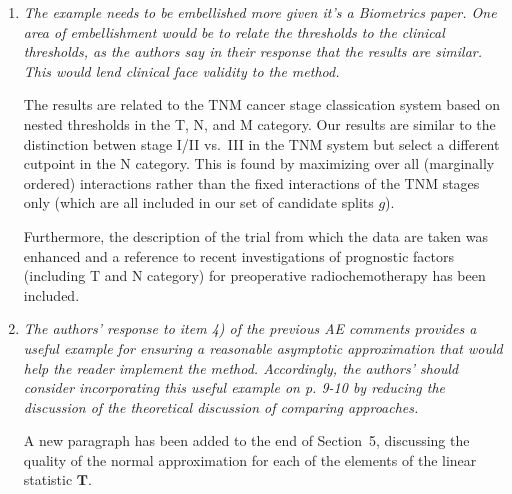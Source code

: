 \documentclass[11pt,a4paper]{article}
\begin{document}
\begin{enumerate}

  \item \textit{The example needs to be embellished more given it's a Biometrics paper. One area of
embellishment would be to relate the thresholds to the clinical thresholds, as the authors
say in their response that the results are similar. This would lend clinical face validity
to the method.}

The results are related to the TNM cancer stage classication system based on
nested thresholds in the T, N, and M category. Our results are similar to 
the distinction betwen stage I/II vs.\ III in the TNM system but select
a different cutpoint in the N category. This is found by maximizing over all
(marginally ordered) interactions rather than the fixed interactions of the
TNM stages only (which are all included in our set of candidate splits $g$).

Furthermore, the description of the trial from which the data are taken 
was enhanced and a reference to recent investigations of prognostic factors (including T and N category)
for preoperative radiochemotherapy has been included.

\item \textit{The authors' response to item 4) of the previous AE comments provides a useful
example for ensuring a reasonable asymptotic approximation that would help the reader
implement the method. Accordingly, the authors' should consider incorporating this
useful example on p. 9-10 by reducing the discussion of the theoretical discussion of
comparing approaches.}

A new paragraph has been added to the end of Section~5, discussing the
quality of the normal approximation for each of the elements of the
linear statistic $\mathbf{T}$.

\end{enumerate}
\end{document}
